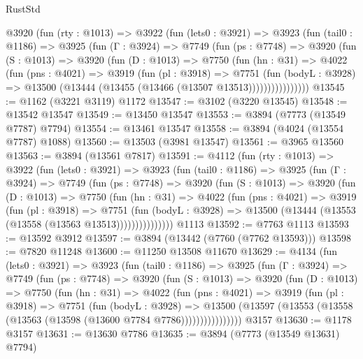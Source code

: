 \begin{lexlean}{RustStd}
\begin{coremodule}
    @3920
      (fun (rty : @1013) =>
      @3922
        (fun (lets0 : @3921) =>
        @3923
          (fun (tail0 : @1186) =>
          @3925
            (fun (Γ : @3924) =>
            @7749
              (fun (ps : @7748) =>
              @3920
                (fun (S : @1013) =>
                @3920
                  (fun (D : @1013) =>
                  @7750
                    (fun (hn : @31) =>
                    @4022
                      (fun (pns : @4021) =>
                      @3919
                        (fun (pl : @3918) =>
                        @7751
                          (fun (bodyL : @3928) =>
                          @13500 (@13444 (@13455 (@13466 (@13507 @13513))))))))))))))))
@13545 := @1162 (@3221 @3119) @1172
@13547 := @3102 (@3220 @13545)
@13548 := @13542 @13547
@13549 := @13450 @13547
@13553 := @3894 (@7773 (@13549 @7787) @7794)
@13554 := @13461 @13547
@13558 := @3894 (@4024 (@13554 @7787) @1088)
@13560 := @13503 (@3981 @13547)
@13561 := @3965 @13560
@13563 := @3894 (@13561 @7817)
@13591 := @4112
    (fun (rty : @1013) =>
    @3922
      (fun (lets0 : @3921) =>
      @3923
        (fun (tail0 : @1186) =>
        @3925
          (fun (Γ : @3924) =>
          @7749
            (fun (ps : @7748) =>
            @3920
              (fun (S : @1013) =>
              @3920
                (fun (D : @1013) =>
                @7750
                  (fun (hn : @31) =>
                  @4022
                    (fun (pns : @4021) =>
                    @3919
                      (fun (pl : @3918) =>
                      @7751
                        (fun (bodyL : @3928) =>
                        @13500 (@13444 (@13553 (@13558 (@13563 @13513)))))))))))))))
    @1113
@13592 := @7763 @1113
@13593 := @13592 @3912
@13597 := @3894 (@13442 (@7760 (@7762 @13593)))
@13598 := @7820 @11248
@13600 := @11250 @13508 @11670
@13629 := @4134
    (fun (lets0 : @3921) =>
    @3923
      (fun (tail0 : @1186) =>
      @3925
        (fun (Γ : @3924) =>
        @7749
          (fun (ps : @7748) =>
          @3920
            (fun (S : @1013) =>
            @3920
              (fun (D : @1013) =>
              @7750
                (fun (hn : @31) =>
                @4022
                  (fun (pns : @4021) =>
                  @3919
                    (fun (pl : @3918) =>
                    @7751
                      (fun (bodyL : @3928) =>
                      @13500
                        (@13597 (@13553 (@13558 (@13563 (@13598 (@13600 @7784 @7786))))))))))))))))
    @3157
@13630 := @1178 @3157
@13631 := @13630 @7786
@13635 := @3894 (@7773 (@13549 @13631) @7794)

\end{coremodule}
\end{lexlean}
